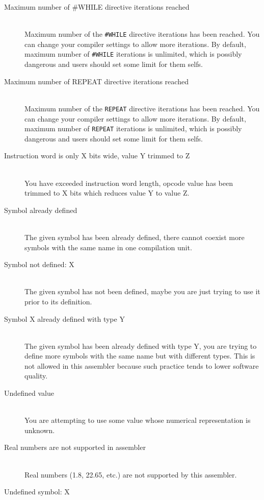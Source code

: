 \begin{description}
        \item[Maximum number of \#WHILE directive iterations reached]~\\
            Maximum number of the \texttt{\#WHILE} directive iterations has been reached. You can change your compiler settings to allow more iterations. By default, maximum number of \texttt{\#WHILE} iterations is unlimited, which is possibly dangerous and users should set some limit for them selfs.
        \item[Maximum number of REPEAT directive iterations reached]~\\
            Maximum number of the \texttt{REPEAT} directive iterations has been reached. You can change your compiler settings to allow more iterations. By default, maximum number of \texttt{REPEAT} iterations is unlimited, which is possibly dangerous and users should set some limit for them selfs.
        \item[Instruction word is only X bits wide, value Y trimmed to Z]~\\
            You have exceeded instruction word length, opcode value has been trimmed to X bits which reduces value Y to value Z.
        \item[Symbol already defined]~\\
            The given symbol has been already defined, there cannot coexist more symbols with the same name in one compilation unit.
        \item[Symbol not defined: X]~\\
            The given symbol has not been defined, maybe you are just trying to use it prior to its definition.
        \item[Symbol X already defined with type Y]~\\
            The given symbol has been already defined with type Y, you are trying to define more symbols with the same name but with different types. This is not allowed in this assembler because such practice tends to lower software quality.
        \item[Undefined value]~\\
            You are attempting to use some value whose numerical representation is unknown.
        \item[Real numbers are not supported in assembler]~\\
            Real numbers (1.8, 22.65, etc.) are not supported by this assembler.
        \item[Undefined symbol: X]~\\

\end{description}
